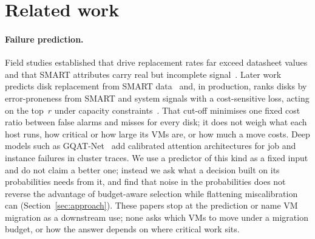 \section{Related work}
\label{sec:related}

\paragraph{Failure prediction.}
Field studies established that drive replacement rates far exceed datasheet values and that
SMART attributes carry real but incomplete signal~\cite{schroeder2007disk,pinheiro2007failure}.
Later work predicts disk replacement from SMART data~\cite{botezatu2016predicting} and, in
production, ranks disks by error-proneness from SMART and system signals with a cost-sensitive
loss, acting on the top~$r$ under capacity constraints~\cite{xu2018cdef}. That cut-off minimises
one fixed cost ratio between false alarms and misses for every disk; it does not weigh what each
host runs, how critical or how large its VMs are, or how much a move costs. Deep models such as
GQAT-Net~\cite{tripathi2025gqat} add calibrated attention architectures for job and instance
failures in cluster traces. We use a predictor of this kind as a fixed input and do not claim a
better one; instead we ask what a decision built on its probabilities needs from it, and find that
noise in the probabilities does not reverse the advantage of budget-aware selection while
flattening miscalibration can (Section~\ref{sec:approach}). These papers stop at the prediction or
name VM migration as a downstream use; none asks which VMs to move under a migration budget, or
how the answer depends on where critical work sits.

